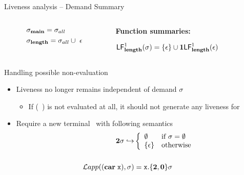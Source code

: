 \documentclass[xcolor=x11names,compress,mathserif]{beamer}
\renewcommand{\(}{\begin{columns}}
\renewcommand{\)}{\end{columns}}
\newcommand{\<}[1]{\begin{column}{#1}}
\renewcommand{\>}{\end{column}}
\begin{document}
\begin{frame}{Liveness analysis -- Demand Summary}
\begin{columns}[c]
\begin{column}[T]{0.30\textwidth}
    \begin{align*}
      &\sigma_{\mathbf{main}} = \sigma_{all}\\
      &\sigma_{\mathbf{length}} = \sigma_{all} \cup\  {\epsilon}
    \end{align*}
    
  \end{column}
  \begin{column}[T]{0.38\textwidth}
    \scriptsize
    \centerline{\bf Function summaries:}
    \bigskip
    $\mathsf{LF}_{\mathit {\mathbf{length}}}^{1}( {\mathit \sigma}) = \{\epsilon\} \cup \mathbf{1}\mathsf{LF}_{\mathit {\mathbf{length}}}^{1}( {\mathit \epsilon})$
  \end{column}
\end{columns}
\end{frame}
\begin{frame} {Handling possible non-evaluation}
  \begin{itemize}
  \item Liveness no longer remains independent of demand $\sigma$ \\
    \begin{itemize}
    \item If (\CAR~\px) is not evaluated at all, it should not generate any liveness for \px
    \end{itemize}
  \item Require a new terminal \clazy\ with following semantics
    \begin{align*}
      {\mathbf{2}}\sigma \hookrightarrow & \left\{ 
      \begin{array}{ll}
        \emptyset&\mbox{if}~\sigma = \emptyset\\
        \{\epsilon\} & \mbox{otherwise}
      \end{array}\right.\\ & \\
      \mathcal{L}app((\mbox{$\mathbf{car}$} \;\mbox{\tt x}),\sigma) &= \mbox{\tt x}.\{{\mathbf{2}}, \mathbf{0}\}\sigma
    \end{align*}
  \end{itemize}
\end{frame}
\end{document}

